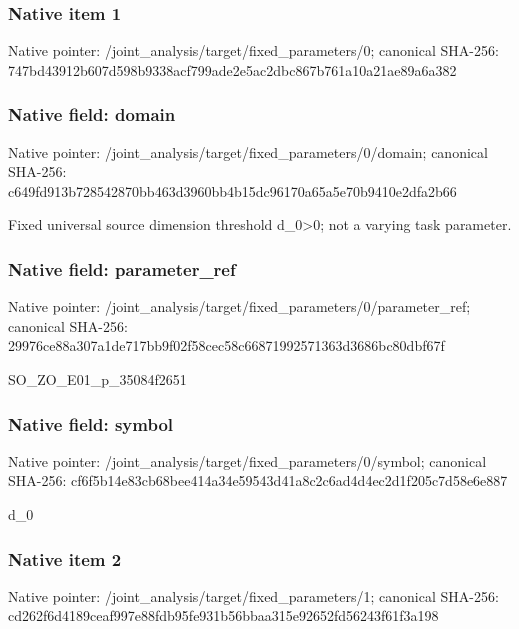 \documentclass[10pt,a4paper]{article}
\begin{document}
\subsubsection{Native item 1}
Native pointer: /joint\_\allowbreak{}analysis/target/fixed\_\allowbreak{}parameters/0; canonical SHA-256: 747bd43912b607d598b9338acf799ade2e5ac2dbc867b761a10a21ae89a6a382

\subsubsection{Native field: domain}
Native pointer: /joint\_\allowbreak{}analysis/target/fixed\_\allowbreak{}parameters/0/domain; canonical SHA-256: c649fd913b728542870bb463d3960bb4b15dc96170a65a5e70b9410e2dfa2b66

\begingroup\raggedright\sloppy Fixed universal source dimension threshold d\_\allowbreak{}0>0;\allowbreak{} not a varying task parameter.\par\endgroup

\subsubsection{Native field: parameter\_\allowbreak{}ref}
Native pointer: /joint\_\allowbreak{}analysis/target/fixed\_\allowbreak{}parameters/0/parameter\_\allowbreak{}ref; canonical SHA-256: 29976ce88a307a1de717bb9f02f58cec58c66871992571363d3686bc80dbf67f

\begingroup\raggedright\sloppy SO\_\allowbreak{}ZO\_\allowbreak{}E01\_\allowbreak{}p\_\allowbreak{}35084f2651\par\endgroup

\subsubsection{Native field: symbol}
Native pointer: /joint\_\allowbreak{}analysis/target/fixed\_\allowbreak{}parameters/0/symbol; canonical SHA-256: cf6f5b14e83cb68bee414a34e59543d41a8c2c6ad4d4ec2d1f205c7d58e6e887

\begingroup\raggedright\sloppy d\_\allowbreak{}0\par\endgroup

\subsubsection{Native item 2}
Native pointer: /joint\_\allowbreak{}analysis/target/fixed\_\allowbreak{}parameters/1; canonical SHA-256: cd262f6d4189ceaf997e88fdb95fe931b56bbaa315e92652fd56243f61f3a198
\end{document}
